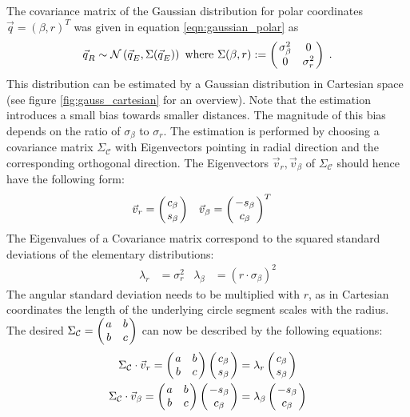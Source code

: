 The covariance matrix of the Gaussian distribution for polar coordinates $\vec q = (\beta, r)^T$ was given in equation \ref{eqn:gaussian_polar} as
\begin{equation*}
  \vec q_R \sim \mathcal{N}\left(\vec q_E, \Sigma(\vec q_E) \right) \text{ where } \Sigma(\beta, r) := \begmat \sigma_\beta^2 & 0 \\ 0 & \sigma_r^2 \finmat \; .
\end{equation*}
This distribution can be estimated by a Gaussian distribution in Cartesian space (see figure \ref{fig:gauss_cartesian} for an overview). Note that the estimation introduces a small bias towards smaller distances. The magnitude of this bias depends on the ratio of $\sigma_\beta$ to $\sigma_r$. The estimation is performed by choosing a covariance matrix $\Sigma_{\mathcal{C}}$ with Eigenvectors pointing in radial direction and the corresponding orthogonal direction. The Eigenvectors $\vec v_r, \vec v_\beta$ of $\Sigma_{\mathcal{C}}$ should hence have the following form:
\begin{align*}
 \vec v_r &= \begmat c_\beta \\ s_\beta \finmat & \vec v_\beta &= \begmat -s_\beta \\ c_\beta \finmat^T
\end{align*}
The Eigenvalues of a Covariance matrix correspond to the squared standard deviations of the elementary distributions:
\begin{align*}
 \lambda_r &= \sigma_r^2 &
 \lambda_\beta &= (r \cdot \sigma_\beta)^2
\end{align*}
The angular standard deviation needs to be multiplied with $r$, as in Cartesian coordinates the length of the underlying circle segment scales with the radius. The desired $\Sigma_{\mathcal{C}} = \left( \left. \begin{matrix} a & b \\ b & c \end{matrix}\right. \right)$ can now be described by the following equations:
\begin{align*}
	 \Sigma_{\mathcal{C}} \cdot \vec v_r = \begmat a & b \\ b & c \finmat \begmat  c_\beta \\  s_\beta \finmat &= \lambda_r \begmat c_\beta \\  s_\beta \finmat \\
	 \Sigma_{\mathcal{C}} \cdot \vec v_\beta = \begmat a & b \\ b & c \finmat \begmat -s_\beta \\  c_\beta \finmat &= \lambda_\beta \begmat -s_\beta \\ c_\beta \finmat
\end{align*}

